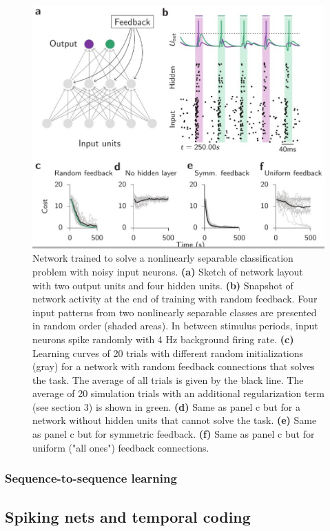 \documentclass[main]{subfiles}
\begin{document}
\begin{figure}[H]
    \centering
    \includegraphics[width=0.8\linewidth]{10_DeepLearningWithSpikes/figures/feedbackalignment.png}
    \caption{Network trained to solve a nonlinearly separable classification problem with noisy input neurons. \textbf{(a)} Sketch of network layout with two output units and four hidden units. \textbf{(b)} Snapshot of network activity at the end of training with random feedback. Four input patterns from two nonlinearly separable classes are presented in random order (shaded areas). In between stimulus periods, input neurons spike randomly with 4 Hz background firing rate. \textbf{(c)} Learning curves of 20 trials with different random initializations (gray) for a network with random feedback connections that solves the task. The average of all trials is given by the black line. The average of 20 simulation trials with an additional regularization term (see section 3) is shown in green. \textbf{(d)} Same as panel c but for a network without hidden units that cannot solve the task. \textbf{(e)} Same as panel c but for symmetric feedback. \textbf{(f)} Same as panel c but for uniform ("all ones") feedback connections.}
    \label{fig:my_label}
\end{figure}


\subsubsection{Sequence-to-sequence learning}

\subsection{Spiking nets and temporal coding}
\end{document}
